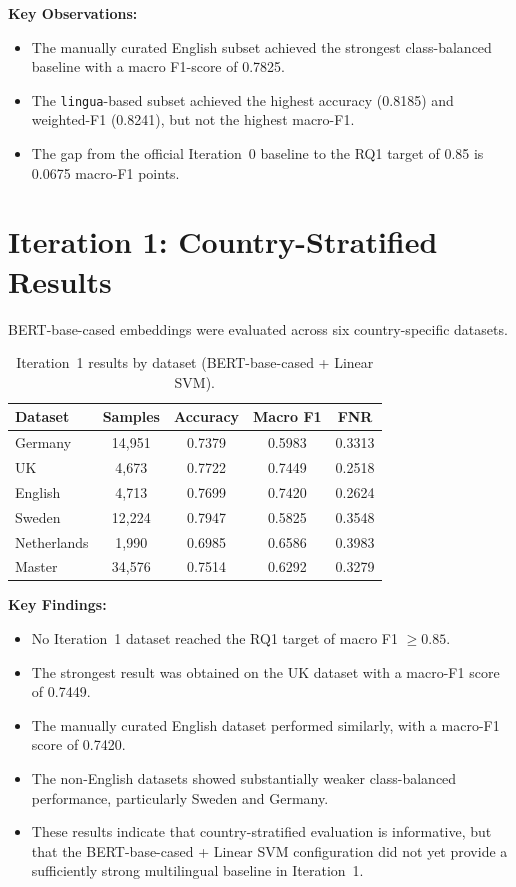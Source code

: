 \documentclass[11pt, titlepage, bibliography=totoc]{scrreprt}
\begin{document}
\textbf{Key Observations:}
\begin{itemize}
    \item The manually curated English subset achieved the strongest class-balanced baseline with a macro F1-score of 0.7825.
    \item The \texttt{lingua}-based subset achieved the highest accuracy (0.8185) and weighted-F1 (0.8241), but not the highest macro-F1.
    \item The gap from the official Iteration~0 baseline to the RQ1 target of 0.85 is 0.0675 macro-F1 points.
\end{itemize}

\section{Iteration 1: Country-Stratified Results}

BERT-base-cased embeddings were evaluated across six country-specific datasets.

\begin{table}[htbp]
\centering
\caption{Iteration~1 results by dataset (BERT-base-cased + Linear SVM).}
\label{tab:results-iter1}
\begin{tabular}{@{}lcccc@{}}
\toprule
\textbf{Dataset} & \textbf{Samples} & \textbf{Accuracy} & \textbf{Macro F1} & \textbf{FNR} \\
\midrule
Germany     & 14,951 & 0.7379 & 0.5983 & 0.3313 \\
UK          & 4,673  & 0.7722 & 0.7449 & 0.2518 \\
English     & 4,713  & 0.7699 & 0.7420 & 0.2624 \\
Sweden      & 12,224 & 0.7947 & 0.5825 & 0.3548 \\
Netherlands & 1,990  & 0.6985 & 0.6586 & 0.3983 \\
Master      & 34,576 & 0.7514 & 0.6292 & 0.3279 \\
\bottomrule
\end{tabular}
\end{table}

\textbf{Key Findings:}
\begin{itemize}
    \item No Iteration~1 dataset reached the RQ1 target of macro F1 $\geq 0.85$.
    \item The strongest result was obtained on the UK dataset with a macro-F1 score of 0.7449.
    \item The manually curated English dataset performed similarly, with a macro-F1 score of 0.7420.
    \item The non-English datasets showed substantially weaker class-balanced performance, particularly Sweden and Germany.
    \item These results indicate that country-stratified evaluation is informative, but that the BERT-base-cased + Linear SVM configuration did not yet provide a sufficiently strong multilingual baseline in Iteration~1.
\end{itemize}
\end{document}
